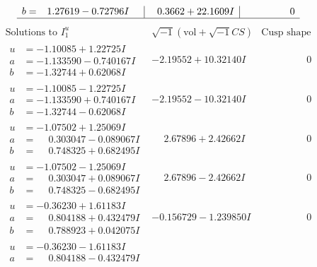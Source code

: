 \documentclass[1p]{elsarticle_modified}
\theoremstyle{definition}
\newcommand{\I}{\sqrt{-1}}
\begin{document}
$$\begin{array}{c|c|c}
\begin{aligned}
b &= \phantom{-}1.27619 - 0.72796 I\end{aligned}
 & \phantom{-}0.3662 + 22.1609 I & \phantom{-0.000000 } 0\\
 \hline 
 \end{array}$$\newpage$$\begin{array}{c|c|c}  
\text{Solutions to }I^u_{1}& \I (\text{vol} + \sqrt{-1}CS) & \text{Cusp shape}\\
 \hline 
\begin{aligned}
u &= -1.10085 + 1.22725 I \\
a &= -1.133590 - 0.740167 I \\
b &= -1.32744 + 0.62068 I\end{aligned}
 & -2.19552 + 10.32140 I & \phantom{-0.000000 } 0 \\ \hline\begin{aligned}
u &= -1.10085 - 1.22725 I \\
a &= -1.133590 + 0.740167 I \\
b &= -1.32744 - 0.62068 I\end{aligned}
 & -2.19552 - 10.32140 I & \phantom{-0.000000 } 0 \\ \hline\begin{aligned}
u &= -1.07502 + 1.25069 I \\
a &= \phantom{-}0.303047 - 0.089067 I \\
b &= \phantom{-}0.748325 + 0.682495 I\end{aligned}
 & \phantom{-}2.67896 + 2.42662 I & \phantom{-0.000000 } 0 \\ \hline\begin{aligned}
u &= -1.07502 - 1.25069 I \\
a &= \phantom{-}0.303047 + 0.089067 I \\
b &= \phantom{-}0.748325 - 0.682495 I\end{aligned}
 & \phantom{-}2.67896 - 2.42662 I & \phantom{-0.000000 } 0 \\ \hline\begin{aligned}
u &= -0.36230 + 1.61183 I \\
a &= \phantom{-}0.804188 + 0.432479 I \\
b &= \phantom{-}0.788923 + 0.042075 I\end{aligned}
 & -0.156729 - 1.239850 I & \phantom{-0.000000 } 0 \\ \hline\begin{aligned}
u &= -0.36230 - 1.61183 I \\
a &= \phantom{-}0.804188 - 0.432479 I \\

\end{aligned}
\end{array}$$
\end{document}
